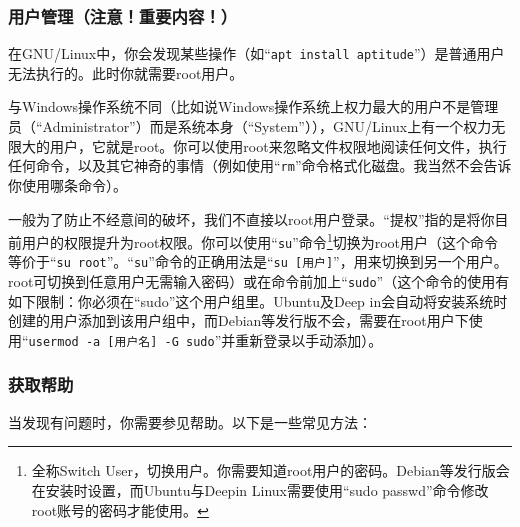 \subsubsection{用户管理（注意！重要内容！）}
\cite{DebianRef}\par
在GNU/Linux中，你会发现某些操作（如“\verb|apt install aptitude|”）是普通用户无法执行的。此时你就需要root用户。\par
与Windows操作系统不同（比如说Windows操作系统上权力最大的用户不是管理员（“Administrator”）而是系统本身（“System”）），GNU/Linux上有一个权力无限大的用户，它就是root。你可以使用root来忽略文件权限地阅读任何文件，执行任何命令，以及其它神奇的事情（例如使用“\verb|rm|”命令格式化磁盘。{\color{red}{警告！这么做将会摧毁整个操作系统！}}我当然不会告诉你使用哪条命令）。\par
一般为了防止不经意间的破坏，我们不直接以root用户登录。“提权”指的是将你目前用户的权限提升为root权限。你可以使用“\verb|su|”命令\footnote{全称Switch User，切换用户。你需要知道root用户的密码。Debian等发行版会在安装时设置，而Ubuntu与Deepin Linux需要使用“sudo passwd”命令修改root账号的密码才能使用。}切换为root用户（这个命令等价于“\verb|su root|”。“\verb|su|”命令的正确用法是“\verb|su [用户]|”，用来切换到另一个用户。root可切换到任意用户无需输入密码）或在命令前加上“\verb|sudo|”（这个命令的使用有如下限制：你必须在“sudo”这个用户组里。Ubuntu及Deep in会自动将安装系统时创建的用户添加到该用户组中，而Debian等发行版不会，需要在root用户下使用“\verb|usermod -a [用户名] -G sudo|”并重新登录以手动添加）。\par
{\color{red}{警告！root用户的不正确操作可能对系统造成不可逆的致命破坏！因此，请：\par
1.确保你输入了正确的命令！GNU/Linux的命令是大小写敏感的。\par
2.不要使用root用户登录桌面环境。\par
3.警告！不要与任何人透露root密码！}}\par
\subsubsection{获取帮助}
\cite{manman}\par
当发现有问题时，你需要参见帮助。以下是一些常见方法：\par

